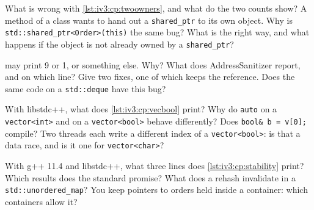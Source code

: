 \begin{question}\label{iq:iv3:cpp:25}
What is wrong with \cref{lst:iv3:cp:twoowners}, and what do the two counts show? A method of a class wants to hand out a \texttt{shared\_ptr} to its own object. Why is \texttt{std::shared\_ptr<Order>(this)} the same bug? What is the right way, and what happens if the object is not already owned by a \texttt{shared\_ptr}?
\label{lst:iv3:cp:twoowners}
\end{question}

\begin{question}\label{iq:iv3:cpp:26}
 may print 9 or 1, or something else. Why? What does AddressSanitizer report, and on which line? Give two fixes, one of which keeps the reference. Does the same code on a \texttt{std::deque} have this bug?
\label{lst:iv3:cp:vecref}
\end{question}

\begin{question}\label{iq:iv3:cpp:27}
With libstdc++, what does \cref{lst:iv3:cp:vecbool} print? Why do \texttt{auto} on a \texttt{vector<int>} and on a \texttt{vector<bool>} behave differently? Does \texttt{bool\& b = v[0];} compile? Two threads each write a different index of a \texttt{vector<bool>}: is that a data race, and is it one for \texttt{vector<char>}?
\label{lst:iv3:cp:vecbool}
\end{question}

\begin{question}\label{iq:iv3:cpp:28}
With g++ 11.4 and libstdc++, what three lines does \cref{lst:iv3:cp:stability} print? Which results does the standard promise? What does a rehash invalidate in a \texttt{std::unordered\_map}? You keep pointers to orders held inside a container: which containers allow it?
\label{lst:iv3:cp:stability}
\end{question}

